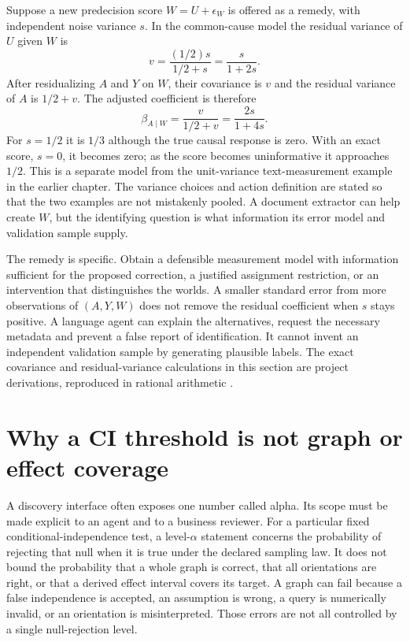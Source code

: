 Suppose a new predecision score $W=U+\epsilon_W$ is offered as a remedy, with
independent noise variance $s$. In the common-cause model the residual variance
of $U$ given $W$ is
\[
 v=\frac{(1/2)s}{1/2+s}=\frac{s}{1+2s}.
\]
After residualizing $A$ and $Y$ on $W$, their covariance is $v$ and the residual
variance of $A$ is $1/2+v$. The adjusted coefficient is therefore
\[
 \beta_{A\mid W}=\frac{v}{1/2+v}=\frac{2s}{1+4s}.
\]
For $s=1/2$ it is $1/3$ although the true causal response is zero. With an exact
score, $s=0$, it becomes zero; as the score becomes uninformative it approaches
$1/2$. This is a separate model from the unit-variance text-measurement example
in the earlier chapter. The variance choices and action definition are stated
so that the two examples are not mistakenly pooled. A document extractor can
help create $W$, but the identifying question is what information its error
model and validation sample supply.

The remedy is specific. Obtain a defensible measurement model with information
sufficient for the proposed correction, a justified assignment restriction, or
an intervention that distinguishes the worlds. A smaller standard error from
more observations of $(A,Y,W)$ does not remove the residual coefficient when
$s$ stays positive. A language agent can explain the alternatives, request the
necessary metadata and prevent a false report of identification. It cannot
invent an independent validation sample by generating plausible labels.
The exact covariance and residual-variance calculations in this section are
project derivations, reproduced in rational arithmetic
\citep{exec14_discovery_oracles}.

\section{Why a CI threshold is not graph or effect coverage}

A discovery interface often exposes one number called alpha. Its scope must be
made explicit to an agent and to a business reviewer. For a particular fixed
conditional-independence test, a level-$\alpha$ statement concerns the
probability of rejecting that null when it is true under the declared sampling
law. It does not bound the probability that a whole graph is correct, that all
orientations are right, or that a derived effect interval covers its target.
A graph can fail because a false independence is accepted, an assumption is
wrong, a query is numerically invalid, or an orientation is misinterpreted.
Those errors are not all controlled by a single null-rejection level.

